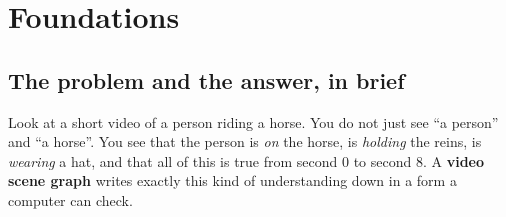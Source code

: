 \documentclass[11pt,openany]{book}
\begin{document}
\tableofcontents

\mainmatter
\part{Foundations}

\chapter{The problem and the answer, in brief}\label{ch:intro}

Look at a short video of a person riding a horse. You do not just see ``a person'' and ``a horse''. You see that the person is
\emph{on} the horse, is \emph{holding} the reins, is \emph{wearing} a hat, and that all of this is true from second 0 to second 8.
A \textbf{video scene graph} writes exactly this kind of understanding down in a form a computer can check.
\end{document}
